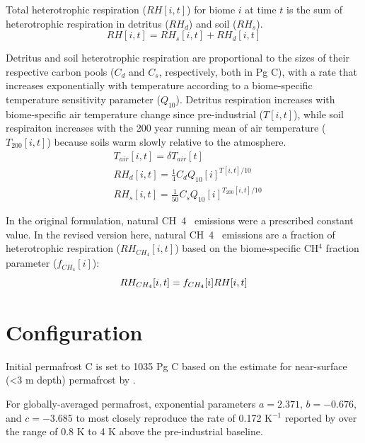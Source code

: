 \documentclass[essd, manuscript]{copernicus}
\begin{document}
Total heterotrophic respiration ($RH[i,t]$) for biome $i$ at time $t$ is the sum of heterotrophic respiration in detritus ($RH_d$) and soil ($RH_s$).
\begin{equation*} 
RH[i,t] = RH_s[i,t] + RH_d[i,t]
\end{equation*}

Detritus and soil heterotrophic respiration are proportional to the sizes of their respective carbon pools ($C_d$ and $C_s$, respectively, both in Pg C),
with a rate that increases exponentially with temperature according to a biome-specific temperature sensitivity parameter ($Q_{10}$).
Detritus respiration increases with biome-specific air temperature change since pre-industrial ($T[i,t]$),
while soil respiraiton increases with the 200 year running mean of air temperature ($T_{200}[i,t]$) because soils warm slowly relative to the atmosphere.
\begin{align}
&T_{air}[i,t] = \delta T_{air}[t] \\
&RH_d[i,t] = \frac{1}{4} C_d Q_{10}[i] ^ {{T}[i,t] / 10} \\
&RH_s[i,t] = \frac{1}{50} C_s Q_{10}[i] ^ {T_{200}[i,t] / 10}
\end{align}

In the original formulation, natural CH~4~ emissions were a prescribed constant value.
In the revised version here, natural CH~4~ emissions are a fraction of heterotrophic respiration ($RH_{CH_4}[i,t]$) based on the biome-specific CH$^4$ fraction parameter ($f_{CH_4}[i]$):
\begin{equation}
    RH_{CH_4}[i,t] = f_{CH_4}[i] RH[i,t] \\
\end{equation}

\section{Configuration}
Initial permafrost C is set to 1035 Pg C based on the estimate for near-surface (<3 m depth) permafrost by \citet{hugelius_2014_estimated}.


For globally-averaged permafrost, exponential parameters $a = 2.371$, $b = -0.676$, and $c = -3.685$ to most closely reproduce the rate of 0.172 K$^{-1}$ reported by \citet{kessler_2017_estimating} over the range of 0.8 K \footnotemark to 4 K above the pre-industrial baseline.

\end{document}
